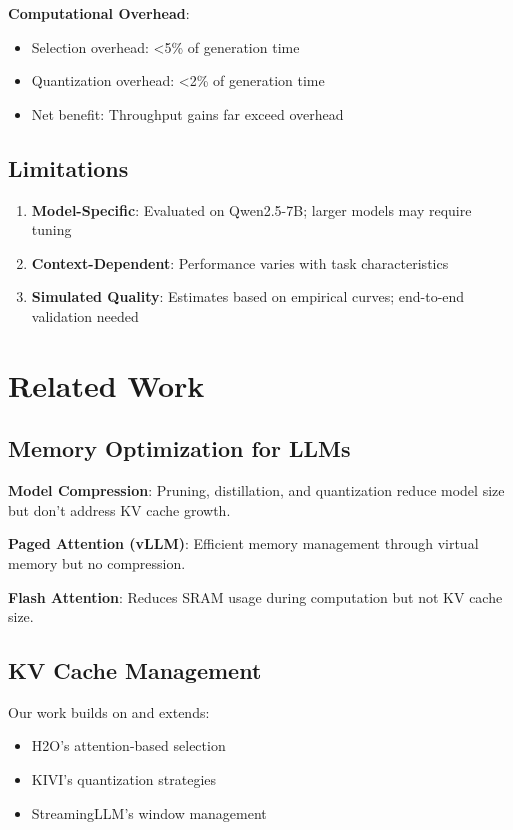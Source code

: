 \documentclass{article}
\begin{document}
\textbf{Computational Overhead}:
\begin{itemize}
\item Selection overhead: <5\% of generation time
\item Quantization overhead: <2\% of generation time
\item Net benefit: Throughput gains far exceed overhead
\end{itemize}

\subsection{Limitations}

\begin{enumerate}
\item \textbf{Model-Specific}: Evaluated on Qwen2.5-7B; larger models may require tuning
\item \textbf{Context-Dependent}: Performance varies with task characteristics
\item \textbf{Simulated Quality}: Estimates based on empirical curves; end-to-end validation needed
\end{enumerate}

\section{Related Work}

\subsection{Memory Optimization for LLMs}

\textbf{Model Compression}: Pruning, distillation, and quantization reduce model size but don't address KV cache growth.

\textbf{Paged Attention (vLLM)}: Efficient memory management through virtual memory but no compression.

\textbf{Flash Attention}: Reduces SRAM usage during computation but not KV cache size.

\subsection{KV Cache Management}

Our work builds on and extends:
\begin{itemize}
\item H2O's attention-based selection
\item KIVI's quantization strategies
\item StreamingLLM's window management
\end{itemize}
\end{document}
